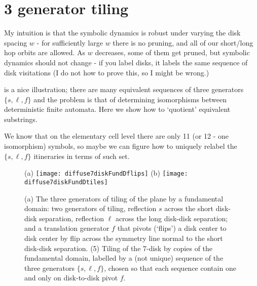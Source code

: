 
	
\chapter{3 generator tiling}
\label{c-3gener}

My intuition is that the symbolic dynamics is robust under varying
the disk spacing $w$ - for sufficiently large $w$ there is no pruning, and all
of our short/long hop orbits are allowed. As $w$ decreases, some of them get pruned,
but symbolic dynamics should not change - if you label disks, it labels the same
sequence of disk visitations (I do not how to prove this, so I might be wrong.)

 is a nice illustration; there are
many equivalent sequences of three generators $\{s,\ell,f\}$ and
the problem is that of determining isomorphisms between deterministic
finite automata. Here we show how to `quotient' equivalent
substrings.

We know that on the elementary
cell level there are only 11 (or 12 -  one isomorphism) symbols, so maybe
we can figure how to uniquely relabel the $\{s,\ell,f\}$ itineraries in
terms of such set.


\begin{figure}
\begin{center}
(a) \texttt{[image: diffuse7diskFundDflips]}
(b) \texttt{[image: diffuse7diskFundDtiles]}
\end{center}
\caption{
(a) The three generators of tiling of the plane by a fundamental domain:
two generators of  tiling, reflection $s$ across the short
disk-disk separation, reflection  $\ell$  across the long disk-disk
separation;
and
a translation generator $f$ that pivots (`flips') a disk center to disk
center by flip across the symmetry line normal to the short disk-disk
separation.
(5) Tiling of the 7-disk by copies of the fundamental domain, labelled
by a (not unique) sequence of the three generators
$\{s,\ell,f\}$, chosen so that each sequence contain one and only on
    disk-to-disk pivot $f$.
        }
\label{7diskFundDflipsA}
\end{figure}

